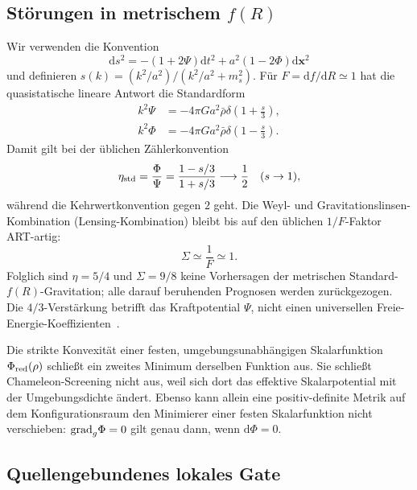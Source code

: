 \documentclass[12pt,a4paper]{article}
\theoremstyle{definition}
\theoremstyle{plain}
\theoremstyle{remark}
\newcommand{\dd}{\mathrm{d}}
\begin{document}
\subsection{\texorpdfstring{Störungen in metrischem \(f(R)\)}{Störungen in metrischem f(R)}}\label{sec:predictions-falsifiable}

Wir verwenden die Konvention
\[
 \dd s^2=-(1+2\Psi)\dd t^2+a^2(1-2\Phi)\dd\mathbf x^2
\]
und definieren
\(s(k)= (k^2/a^2)/(k^2/a^2+m_s^2)\).
Für \(F=\dd f/\dd R\simeq1\) hat die quasistatische lineare Antwort die
Standardform
\begin{align}
 k^2\Psi&=-4\pi Ga^2\bar\rho\delta
 \left(1+\frac{s}{3}\right),\label{eq:Poisson-Psi}\\
 k^2\Phi&=-4\pi Ga^2\bar\rho\delta
 \left(1-\frac{s}{3}\right).\label{eq:Poisson-Phi}
\end{align}
Damit gilt bei der üblichen Zählerkonvention
\begin{equation}\label{eq:grav-slip}
 \eta_{\rm std}=\frac{\Phi}{\Psi}
 =\frac{1-s/3}{1+s/3}
 \longrightarrow\frac12
 \quad (s\to1),
\end{equation}
während die Kehrwertkonvention gegen \(2\) geht. Die Weyl- und Gravitationslinsen-Kombination (Lensing-Kombination)
bleibt bis auf den üblichen \(1/F\)-Faktor ART-artig:
\begin{equation}\label{eq:Sigma}
 \Sigma\simeq\frac1F\simeq1 .
\end{equation}
Folglich sind \(\eta=5/4\) und \(\Sigma=9/8\) keine Vorhersagen der
metrischen Standard-\(f(R)\)-Gravitation; alle darauf beruhenden Prognosen
werden zurückgezogen. Die \(4/3\)-Verstärkung betrifft das Kraftpotential
\(\Psi\), nicht einen universellen
Freie-Energie-Koeffizienten~\cite{HuSawicki2007,SotiriouFaraoni2010}.

Die strikte Konvexität einer festen, umgebungsunabhängigen Skalarfunktion
\(\Phi_{\rm red}(\rho)\) schließt ein zweites Minimum derselben Funktion aus.
Sie schließt Chameleon-Screening nicht aus, weil sich dort das effektive
Skalarpotential mit der Umgebungsdichte ändert. Ebenso kann allein eine
positiv-definite Metrik auf dem Konfigurationsraum den Minimierer einer festen
Skalarfunktion nicht verschieben: \({\rm grad}_g\Phi=0\) gilt genau dann,
wenn \(\dd\Phi=0\).

\subsection{Quellengebundenes lokales Gate}\label{sec:mcmc-results}
\end{document}
